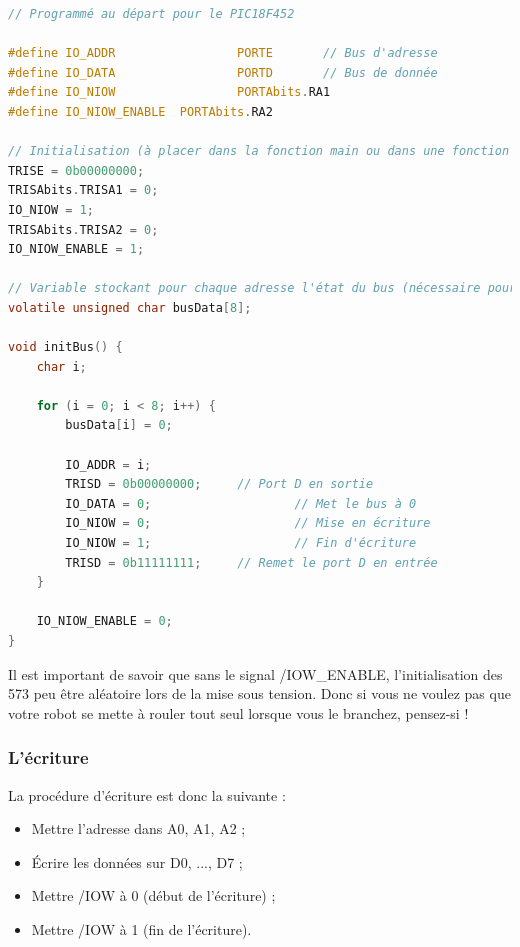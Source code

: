 \documentclass[a4paper]{article}
\begin{document}
\begin{lstlisting}[caption=Implémentation en C pour l'initialisation en écriture du bus, label=Implementation_en_C_pour_initialisation_en_ecriture_du_bus, language=c]
// Programmé au départ pour le PIC18F452

#define IO_ADDR					PORTE		// Bus d'adresse
#define IO_DATA					PORTD		// Bus de donnée
#define IO_NIOW					PORTAbits.RA1
#define IO_NIOW_ENABLE	PORTAbits.RA2

// Initialisation (à placer dans la fonction main ou dans une fonction d'initialisation du bus)
TRISE = 0b00000000;
TRISAbits.TRISA1 = 0;
IO_NIOW = 1;
TRISAbits.TRISA2 = 0;
IO_NIOW_ENABLE = 1;

// Variable stockant pour chaque adresse l'état du bus (nécessaire pour l'écriture bit par bit sur le bus, voir la fonction writeBusBit)
volatile unsigned char busData[8];

void initBus() {
	char i;

	for (i = 0; i < 8; i++) {
		busData[i] = 0;

		IO_ADDR = i;
		TRISD = 0b00000000;		// Port D en sortie
		IO_DATA = 0;					// Met le bus à 0
		IO_NIOW = 0;					// Mise en écriture
		IO_NIOW = 1;					// Fin d'écriture
		TRISD = 0b11111111;		// Remet le port D en entrée
	}

	IO_NIOW_ENABLE = 0;
}
\end{lstlisting}

Il est important de savoir que sans le signal /IOW\_ENABLE, l'initialisation des 573 peu être aléatoire lors de la mise sous tension. Donc si vous ne voulez pas que votre robot se mette à rouler tout seul lorsque vous le branchez, pensez-si !

\subsubsection{L'écriture}

La procédure d'écriture est donc la suivante :

\begin{itemize}
	\item Mettre l'adresse dans A0, A1, A2 ;
	\item Écrire les données sur D0, ..., D7 ;
	\item Mettre /IOW à 0 (début de l'écriture) ;
	\item Mettre /IOW à 1 (fin de l'écriture).
\end{itemize}
\end{document}

